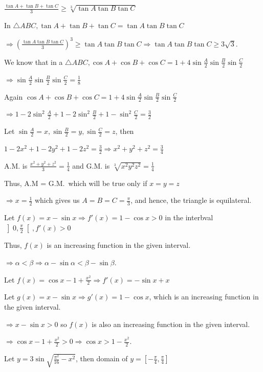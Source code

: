   $\frac{\tan A + \tan B + \tan C}{3}\geq \sqrt[3]{\tan A\tan B\tan C}$

  In $\triangle ABC, \tan A + \tan B + \tan C = \tan A\tan B\tan C$

  $\Rightarrow \left(\frac{\tan A\tan B\tan C}{3}\right)^3\geq \tan A\tan B\tan C \Rightarrow \tan
  A\tan B\tan C\geq 3\sqrt{3}$.
\item We know that in a $\triangle ABC, \cos A + \cos B + \cos C = 1 +
  4\sin\frac{A}{2}\sin\frac{B}{2}\sin\frac{C}{2}$

  $\Rightarrow \sin\frac{A}{2}\sin\frac{B}{2}\sin\frac{C}{2} = \frac{1}{8}$

  Again $\cos A + \cos B + \cos C = 1 + 4\sin\frac{A}{2}\sin\frac{B}{2}\sin\frac{C}{2}$

  $\Rightarrow 1 - 2\sin^2\frac{A}{2} + 1 - 2\sin^2\frac{B}{2} + 1 - \sin^2\frac{C}{2} = \frac{3}{2}$

  Let $\sin\frac{A}{2} = x, \sin\frac{B}{2} = y, \sin\frac{C}{2} = z$, then

  $1 - 2x^2 + 1 - 2y^2 + 1 - 2z^2 = \frac{3}{2} \Rightarrow x^2 + y^2 + z^2 = \frac{3}{4}$

  A.M. is $\frac{x^2 + y^2 + z^2}{3} = \frac{1}{4}$ and G.M. is $\sqrt[3]{x^2y^2z^2} = \frac{1}{4}$

  Thus, A.M = G.M.\ which will be true only if $x = y = z$

  $\Rightarrow x = \frac{1}{2}$ which gives us $A = B = C = \frac{\pi}{3}$, and hence, the triangle is
  equilateral.
\item Let $f(x) = x - \sin x\Rightarrow f'(x) = 1 - \cos x > 0$ in the interbval $\left]0,
  \frac{\pi}{2}\right[, f'(x) > 0$

  Thus, $f(x)$ is an increasing function in the given interval.

  $\Rightarrow \alpha < \beta \Rightarrow \alpha - \sin\alpha < \beta - \sin\beta$.
\item Let $f(x) = \cos x - 1 + \frac{x^2}{2} \Rightarrow f'(x) = -\sin x + x$

  Let $g(x) = x - \sin x \Rightarrow g'(x) = 1 - \cos x$, which is an increasing function in the given
  interval.

  $\Rightarrow x - \sin x > 0$ so $f(x)$ is also an increasing function in the given interval.

  $\Rightarrow \cos x - 1 + \frac{x^2}{2} > 0 \Rightarrow \cos x > 1 - \frac{x^2}{2}$.
\item Let $y = 3\sin \sqrt{\frac{\pi^2}{16} - x^2}$, then domain of $y = \left[-\frac{\pi}{4},
  \frac{\pi}{4}\right]$

